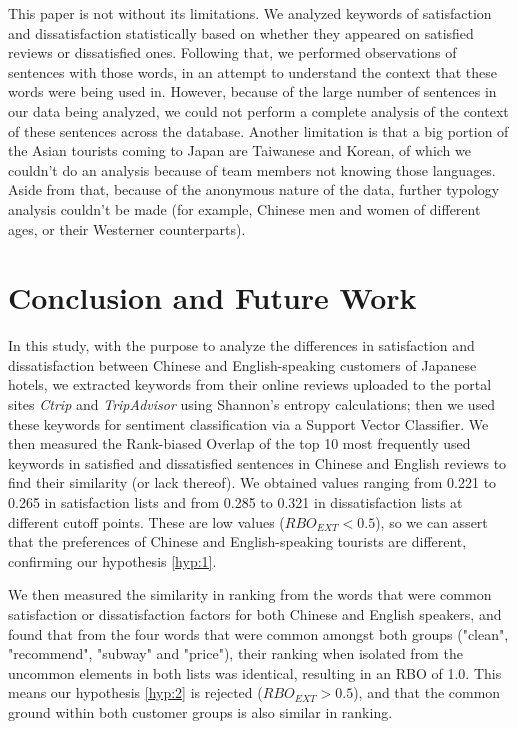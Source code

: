 This paper is not without its limitations. We analyzed keywords of satisfaction and dissatisfaction statistically based on whether they appeared on satisfied reviews or dissatisfied ones. Following that, we performed observations of sentences with those words, in an attempt to understand the context that these words were being used in. However, because of the large number of sentences in our data being analyzed, we could not perform a complete analysis of the context of these sentences across the database. Another limitation is that a big portion of the Asian tourists coming to Japan are Taiwanese and Korean, of which we couldn't do an analysis because of team members not knowing those languages. Aside from that, because of the anonymous nature of the data, further typology analysis couldn't be made (for example, Chinese men and women of different ages, or their Westerner counterparts).

\section{Conclusion and Future Work}\label{conclusion}

In this study, with the purpose to analyze the differences in satisfaction and dissatisfaction between Chinese and English-speaking customers of Japanese hotels, we extracted keywords from their online reviews uploaded to the portal sites \textit{Ctrip} and \textit{TripAdvisor} using Shannon's entropy calculations; then we used these keywords for sentiment classification via a Support Vector Classifier. We then measured the Rank-biased Overlap of the top 10 most frequently used keywords in satisfied and dissatisfied sentences in Chinese and English reviews to find their similarity (or lack thereof). We obtained values ranging from 0.221 to 0.265 in satisfaction lists and from 0.285 to 0.321 in dissatisfaction lists at different cutoff points. These are low values (\(RBO_{EXT} < 0.5\)), so we can assert that the preferences of Chinese and English-speaking tourists are different, confirming our hypothesis \ref{hyp:1}. 

We then measured the similarity in ranking from the words that were common satisfaction or dissatisfaction factors for both Chinese and English speakers, and found that from the four words that were common amongst both groups ("clean", "recommend", "subway" and "price"), their ranking when isolated from the uncommon elements in both lists was identical, resulting in an RBO of 1.0. This means our hypothesis \ref{hyp:2} is rejected (\(RBO_{EXT} > 0.5\)), and that the common ground within both customer groups is also similar in ranking.

